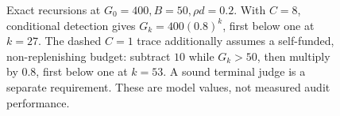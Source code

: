 \begin{figure}[H]
\caption{Exact recursions at $G_0=400,B=50,\rho d=0.2$. With $C=8$, conditional detection gives $G_k=400(0.8)^k$, first below one at $k=27$. The dashed $C=1$ trace additionally assumes a self-funded, non-replenishing budget: subtract $10$ while $G_k>50$, then multiply by $0.8$, first below one at $k=53$. A sound terminal judge is a separate requirement. These are model values, not measured audit performance.}
\label{fig:rate-raters}
\end{figure}
